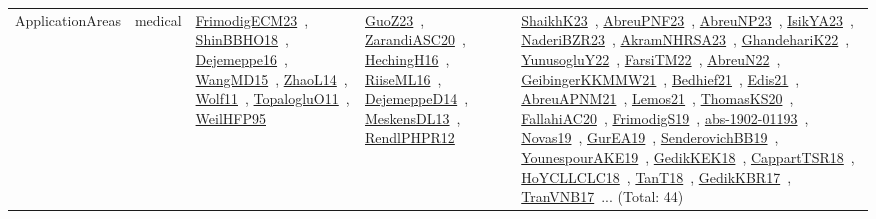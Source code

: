 {\begin{longtable}{lp{3cm}>{\raggedright\arraybackslash}p{6cm}>{\raggedright\arraybackslash}p{6cm}>{\raggedright\arraybackslash}p{8cm}}
\index{medical}\index{ApplicationAreas!medical}ApplicationAreas & medical & \href{../works/FrimodigECM23.pdf}{FrimodigECM23}~\cite{FrimodigECM23}, \href{../works/ShinBBHO18.pdf}{ShinBBHO18}~\cite{ShinBBHO18}, \href{../works/Dejemeppe16.pdf}{Dejemeppe16}~\cite{Dejemeppe16}, \href{../works/WangMD15.pdf}{WangMD15}~\cite{WangMD15}, \href{../works/ZhaoL14.pdf}{ZhaoL14}~\cite{ZhaoL14}, \href{../works/Wolf11.pdf}{Wolf11}~\cite{Wolf11}, \href{../works/TopalogluO11.pdf}{TopalogluO11}~\cite{TopalogluO11}, \href{../works/WeilHFP95.pdf}{WeilHFP95}~\cite{WeilHFP95} & \href{../works/GuoZ23.pdf}{GuoZ23}~\cite{GuoZ23}, \href{../works/ZarandiASC20.pdf}{ZarandiASC20}~\cite{ZarandiASC20}, \href{../works/HechingH16.pdf}{HechingH16}~\cite{HechingH16}, \href{../works/RiiseML16.pdf}{RiiseML16}~\cite{RiiseML16}, \href{../works/DejemeppeD14.pdf}{DejemeppeD14}~\cite{DejemeppeD14}, \href{../works/MeskensDL13.pdf}{MeskensDL13}~\cite{MeskensDL13}, \href{../works/RendlPHPR12.pdf}{RendlPHPR12}~\cite{RendlPHPR12} & \href{../works/ShaikhK23.pdf}{ShaikhK23}~\cite{ShaikhK23}, \href{../works/AbreuPNF23.pdf}{AbreuPNF23}~\cite{AbreuPNF23}, \href{../works/AbreuNP23.pdf}{AbreuNP23}~\cite{AbreuNP23}, \href{../works/IsikYA23.pdf}{IsikYA23}~\cite{IsikYA23}, \href{../works/NaderiBZR23.pdf}{NaderiBZR23}~\cite{NaderiBZR23}, \href{../works/AkramNHRSA23.pdf}{AkramNHRSA23}~\cite{AkramNHRSA23}, \href{../works/GhandehariK22.pdf}{GhandehariK22}~\cite{GhandehariK22}, \href{../works/YunusogluY22.pdf}{YunusogluY22}~\cite{YunusogluY22}, \href{../works/FarsiTM22.pdf}{FarsiTM22}~\cite{FarsiTM22}, \href{../works/AbreuN22.pdf}{AbreuN22}~\cite{AbreuN22}, \href{../works/GeibingerKKMMW21.pdf}{GeibingerKKMMW21}~\cite{GeibingerKKMMW21}, \href{../works/Bedhief21.pdf}{Bedhief21}~\cite{Bedhief21}, \href{../works/Edis21.pdf}{Edis21}~\cite{Edis21}, \href{../works/AbreuAPNM21.pdf}{AbreuAPNM21}~\cite{AbreuAPNM21}, \href{../works/Lemos21.pdf}{Lemos21}~\cite{Lemos21}, \href{../works/ThomasKS20.pdf}{ThomasKS20}~\cite{ThomasKS20}, \href{../works/FallahiAC20.pdf}{FallahiAC20}~\cite{FallahiAC20}, \href{../works/FrimodigS19.pdf}{FrimodigS19}~\cite{FrimodigS19}, \href{../works/abs-1902-01193.pdf}{abs-1902-01193}~\cite{abs-1902-01193}, \href{../works/Novas19.pdf}{Novas19}~\cite{Novas19}, \href{../works/GurEA19.pdf}{GurEA19}~\cite{GurEA19}, \href{../works/SenderovichBB19.pdf}{SenderovichBB19}~\cite{SenderovichBB19}, \href{../works/YounespourAKE19.pdf}{YounespourAKE19}~\cite{YounespourAKE19}, \href{../works/GedikKEK18.pdf}{GedikKEK18}~\cite{GedikKEK18}, \href{../works/CappartTSR18.pdf}{CappartTSR18}~\cite{CappartTSR18}, \href{../works/HoYCLLCLC18.pdf}{HoYCLLCLC18}~\cite{HoYCLLCLC18}, \href{../works/TanT18.pdf}{TanT18}~\cite{TanT18}, \href{../works/GedikKBR17.pdf}{GedikKBR17}~\cite{GedikKBR17}, \href{../works/TranVNB17.pdf}{TranVNB17}~\cite{TranVNB17}... (Total: 44)\\

\end{longtable}}
